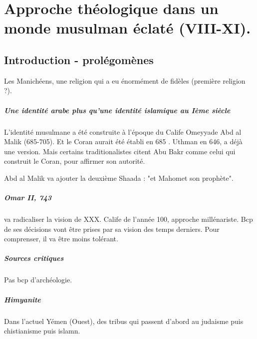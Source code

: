 \chapter{Approche théologique dans un monde musulman éclaté (VIII-XI).}


\section{Introduction - prolégomènes}
Les Manichéens, une religion qui a eu énormément de fidèles (première religion ?).
\begin{Def}[manichéisme]
\end{Def}

\paragraph{Une identité arabe plus qu'une identité islamique au Ième siècle} L'identité musulmane a été construite à l'époque du Calife Omeyyade Abd al Malik (685-705). Et le Coran aurait été établi en 685 . Uthman en 646, a déjà une version. Mais certains traditionalistes citent Abu Bakr comme celui qui construit le Coran, pour affirmer son autorité.

Abd al Malik va ajouter la deuxième Shaada : "et Mahomet son prophète". 

\paragraph{Omar II, 743} va radicaliser la vision de XXX. Calife de l'année 100, approche millénariste.
Bcp de ses décisions vont être prises par sa vision des temps derniers. Pour comprenser, il va être moins tolérant.

\paragraph{Sources critiques} Pas bcp d'archéologie. 

\paragraph{Himyanite} Dans l'actuel Yémen (Ouest), des tribus qui passent d'abord au judaisme puis chistianisme  puis islamn. 



